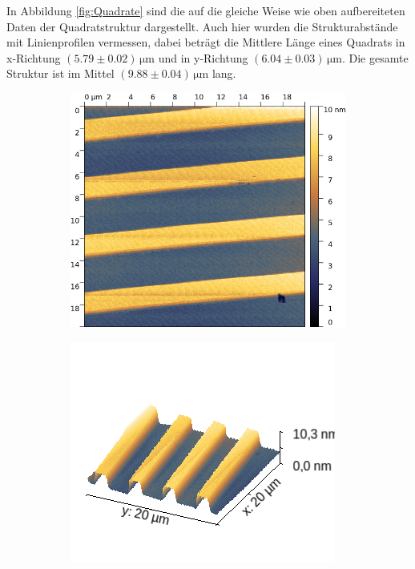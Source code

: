 In Abbildung \ref{fig:Quadrate} sind die auf die gleiche Weise wie oben aufbereiteten Daten der Quadratstruktur dargestellt.
Auch hier wurden die Strukturabstände mit Linienprofilen vermessen, dabei beträgt die Mittlere Länge eines Quadrats in x-Richtung $(5.79\pm 0.02)\,\si{\micro\meter}$ und in y-Richtung $(6.04\pm 0.03)\,\si{\micro\meter}$.
Die gesamte Struktur ist im Mittel $(9.88\pm 0.04)\,\si{\micro\meter}$ lang. 

\begin{figure}[H]
    \centering
    \begin{subfigure}{0.49\textwidth}
        \includegraphics[width=\textwidth]{bilder/Mikrostruktur/Streifen_Vor_2D.png}
        \caption{}
    \end{subfigure}
    \begin{subfigure}{0.49\textwidth}
        \includegraphics[width=\textwidth]{bilder/Mikrostruktur/Streifen_Vor_3D.png}

\end{subfigure}
\end{figure}
